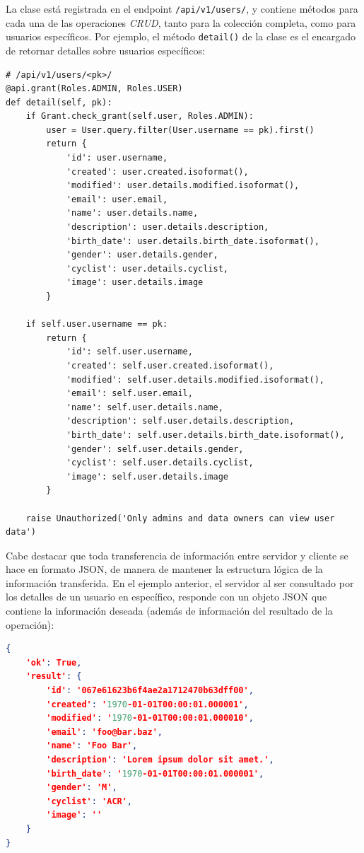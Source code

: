 \documentclass[11pt,letterpaper]{article}
\begin{document}
La clase está registrada en el endpoint \texttt{/api/v1/users/}, y contiene métodos para cada una de las operaciones \emph{CRUD}, tanto para la colección completa, como para usuarios específicos. Por ejemplo, el método \texttt{detail()} de la clase es el encargado de retornar detalles sobre usuarios específicos:
\begin{lstlisting}[title=Método de obtención de detalles de usuario.]
# /api/v1/users/<pk>/
@api.grant(Roles.ADMIN, Roles.USER)
def detail(self, pk):
    if Grant.check_grant(self.user, Roles.ADMIN):
        user = User.query.filter(User.username == pk).first()
        return {
            'id': user.username,
            'created': user.created.isoformat(),
            'modified': user.details.modified.isoformat(),
            'email': user.email,
            'name': user.details.name,
            'description': user.details.description,
            'birth_date': user.details.birth_date.isoformat(),
            'gender': user.details.gender,
            'cyclist': user.details.cyclist,
            'image': user.details.image
        }

    if self.user.username == pk:
        return {
            'id': self.user.username,
            'created': self.user.created.isoformat(),
            'modified': self.user.details.modified.isoformat(),
            'email': self.user.email,
            'name': self.user.details.name,
            'description': self.user.details.description,
            'birth_date': self.user.details.birth_date.isoformat(),
            'gender': self.user.details.gender,
            'cyclist': self.user.details.cyclist,
            'image': self.user.details.image
        }

    raise Unauthorized('Only admins and data owners can view user data')
\end{lstlisting}
\newpage
Cabe destacar que toda transferencia de información entre servidor y cliente se hace en formato JSON, de manera de mantener la estructura lógica de la información transferida. En el ejemplo anterior, el servidor al ser consultado por los detalles de un usuario en específico, responde con un objeto JSON que contiene la información deseada (además de información del resultado de la operación):
\begin{lstlisting}[language=json, title=Ejemplo de respuesta del servidor.]
{
    'ok': True,
    'result': {
        'id': '067e61623b6f4ae2a1712470b63dff00',
        'created': '1970-01-01T00:00:01.000001',
        'modified': '1970-01-01T00:00:01.000010',
        'email': 'foo@bar.baz',
        'name': 'Foo Bar',
        'description': 'Lorem ipsum dolor sit amet.',
        'birth_date': '1970-01-01T00:00:01.000001',
        'gender': 'M',
        'cyclist': 'ACR',
        'image': ''
    }
}
\end{lstlisting}
\end{document}
